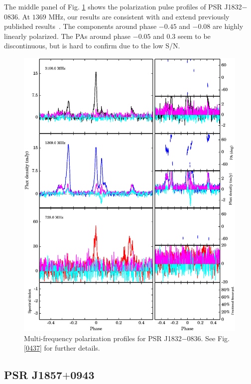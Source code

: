 \documentclass[useAMS,usenatbib]{mn2e}
\begin{document}
The middle panel of Fig. \ref{1832} shows the polarization pulse profiles of 
PSR J1832$-$0836.
%
At $1369$ MHz, our results are consistent with and extend previously published 
results~\citep{Burgay13}.
%
The components around phase $-0.45$ and $-0.08$ are highly linearly polarized. 
%
The PAs around phase $-0.05$ and $0.3$ seem to be discontinuous, but is hard 
to confirm due to the low S/N.

\begin{figure}
\begin{center}
\includegraphics[width=6 in]{1832.ps}
\caption{Multi-frequency polarization profiles for PSR J1832$-$0836. 
See Fig. \ref{0437} for further details.}
\label{1832}
\end{center}
\end{figure}


\subsection{PSR J1857$+$0943}
\end{document}
